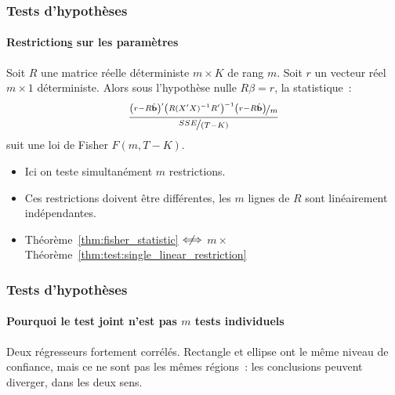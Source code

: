 \documentclass[10pt]{beamer}
\begin{document}
\begin{frame}
  \frametitle{Tests d'hypothèses}
  \framesubtitle{Restriction\underline{s} sur les paramètres}

  \begin{theorem}\label{thm:fisher_statistic}
    Soit $R$ une matrice réelle déterministe $m\times K$ de rang $m$. Soit $r$ un vecteur réel  $m\times 1$ déterministe. Alors sous l'hypothèse nulle $R\beta=r$, la statistique~:
    \[
      \frac{\nicefrac{\left(r-R\hat{\mathbf b}\right)'\left( R(X'X)^{-1}R' \right)^{-1}\left(r-R\hat{\mathbf b}\right)}{m}}{\nicefrac{SSE}{(T-K)}}
    \]
 suit une loi de Fisher $F\left(m, T-K\right)$.
  \end{theorem}

  \bigskip

  \begin{itemize}

  \item Ici on teste simultanément $m$ restrictions.\newline

  \item Ces restrictions doivent être différentes, les $m$ lignes de $R$ sont linéairement indépendantes.\newline

  \item Théorème~\ref{thm:fisher_statistic} $\centernot{\Longleftrightarrow}$  $m\times$Théorème~\ref{thm:test:single_linear_restriction}

  \end{itemize}

\end{frame}


\begin{frame}[c]
  \frametitle{Tests d'hypothèses}
  \framesubtitle{Pourquoi le test joint n'est pas $m$ tests individuels}

  \begin{center}
    \scalebox{.74}{}
  \end{center}

  \medskip

  {\small Deux régresseurs fortement corrélés. Rectangle et ellipse ont le même niveau
    de confiance, mais ce ne sont pas les mêmes régions~: les conclusions peuvent
    diverger, dans les deux sens.}

\end{frame}
\end{document}
